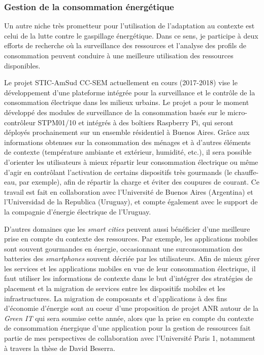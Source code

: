 \subsubsection*{Gestion de la consommation énergétique}

Un autre niche très prometteur pour l'utilisation de l'adaptation au contexte est celui de la lutte contre le gaspillage énergétique. Dans ce sens, je participe à deux efforts de recherche où la surveillance des ressources et l'analyse des profils de consommation peuvent conduire à une meilleure utilisation des ressources disponibles.

Le projet STIC-AmSud CC-SEM actuellement en cours (2017-2018) vise le développement d'une plateforme intégrée pour la surveillance et le contrôle de la consommation électrique dans les milieux urbains. Le projet a pour le moment développé des modules de surveillance de la consommation basés sur le micro-contrôleur STPM01/10 et intégrés à des boîtiers Raspberry Pi, qui seront déployés prochainement sur un ensemble résidentiel à Buenos Aires. Grâce aux informations obtenues sur la consommation des ménages et à d'autres éléments de contexte (température ambiante et extérieur, humidité, etc.), il sera possible d'orienter les utilisateurs à mieux répartir leur consommation électrique ou même d'agir en contrôlant l'activation de certains dispositifs très gourmands (le chauffe-eau, par exemple), afin de répartir la charge et éviter des coupures de courant.  Ce travail est fait en collaboration avec l'Université de Buenos Aires (Argentina) et l'Universidad de la Republica (Uruguay), et  compte également avec le support de la compagnie d'énergie électrique de l'Uruguay.

D'autres domaines que les \textit{smart cities} peuvent aussi bénéficier d'une meilleure prise en compte du contexte des ressources. Par exemple, les applications mobiles sont souvent gourmandes en énergie, occasionnant une surconsommation des batteries des \textit{smartphones} souvent décriée par les utilisateurs. Afin de mieux gérer les services et les applications mobiles en vue de leur consommation électrique, il faut utiliser les informations de contexte dans le but d'intégrer des stratégies de placement et la migration de services entre les dispositifs mobiles et les infrastructures. La migration de composants et d’applications à des fins d’économie d’énergie sont au c{oe}ur d’une proposition de projet ANR autour de la \textit{Green IT} qui sera soumise cette année, alors que la prise en compte du contexte de consommation énergique d’une application pour la gestion de ressources fait partie de mes perspectives de collaboration avec l’Université Paris 1, notamment à travers la thèse de David Beserra. 





